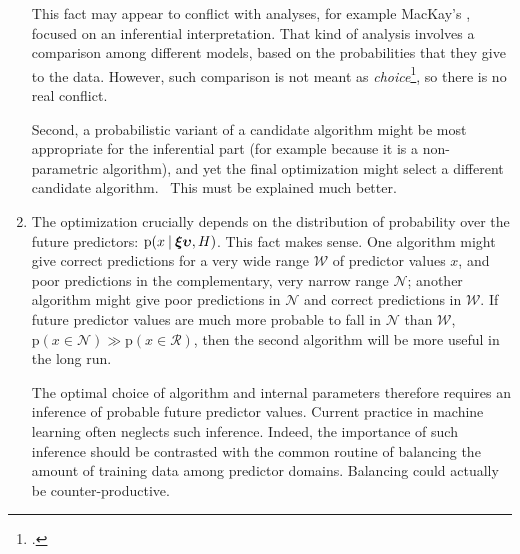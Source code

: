\documentclass[\ifafour a4paper,12pt,\else a5paper,10pt,\fi%
onecolumn,oneside,article,%
british%
]{memoir}
\theoremstyle{remark}
\theoremstyle{innote}
\newcommand*{\citep}{\footcites}
\newcommand*{\p}{\mathrm{p}}%
\renewcommand*{\|}[1][]{\nonscript\:#1\vert\nonscript\:\mathopen{}}
\newcommand*{\eq}[1][=]{\mathrel{\!#1\!}}
\newcommand*{\sect}{\S}%
\newcommand*{\wrench}{{\fontencoding{U}\fontfamily{fontawesomethree}\selectfont\symbol{114}}}
\newcommand{\mynote}[1]{ {\color{notecolour}#1}}
\newcommand*{\bzz}{\bm{\xi\upsilon}}
\begin{document}
\begin{enumerate}[label=\textbf{(\Alph*)}, wide]
  This fact may appear to conflict with analyses, for example MacKay's
  \parencite*[esp.\ \sect~5]{mackay1992}, focused on an inferential
  interpretation. That kind of analysis involves a comparison among
  different models, based on the probabilities that they give to the data.
  However, such comparison is not meant as
  \emph{choice}\citep[\enquote{This paper concerns inference alone and no
    loss functions or utilities are
    involved}][footnote~1]{mackay1992}[\enquote{When we discuss model
    comparison, this should not be construed as implying model
    \emph{choice}}][\sect~28.1 p.~347]{mackay1995_r2005}, so there is no
  real conflict.


  Second, a probabilistic variant of a candidate algorithm might be most
  appropriate for the inferential part (for example because it is a
  non-parametric algorithm), and yet the final optimization might select a
  different candidate algorithm. \mynote{\wrench\ This must be explained
    much better.}
  
\item\label{item:px_needed} The optimization crucially depends on the
  distribution of probability over the future predictors: $\p(x\|\bzz,H)$.
  This fact makes sense. One algorithm might give correct predictions for a
  very wide range $\mathcal{W}$ of predictor values $x$, and poor
  predictions in the complementary, very narrow range $\mathcal{N}$;
  another algorithm might give poor predictions in $\mathcal{N}$ and
  correct predictions in $\mathcal{W}$. If future predictor values are much
  more probable to fall in $\mathcal{N}$ than $\mathcal{W}$,
  $\p(x \eq[\in] \mathcal{N}) \gg \p(x \eq[\in] \mathcal{R})$, then the
  second algorithm will be more useful in the long run.

  The optimal choice of algorithm and internal parameters therefore
  requires an inference of probable future predictor values. Current
  practice in machine learning often neglects such inference. Indeed, the
  importance of such inference should be contrasted with the common routine
  of balancing the amount of training data among predictor domains.
  Balancing could actually be counter-productive.
\end{enumerate}



\end{document}
